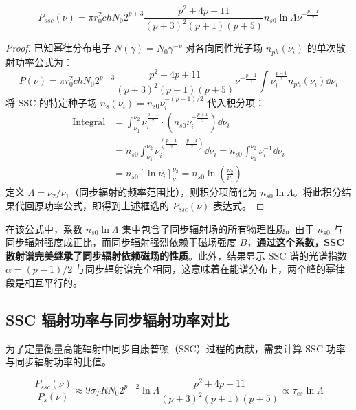 \begin{theorem}
    \begin{equation}
        \boxed{P_{ssc}(\nu) = \pi r_0^2 ch N_0 2^{p+3} \frac{p^2+4p+11}{(p+3)^2(p+1)(p+5)} n_{s0} \ln \Lambda \nu^{-\frac{p-1}{2}}}
    \end{equation}
\end{theorem}

\begin{proof}
    已知幂律分布电子 $N(\gamma) = N_0 \gamma^{-p}$ 对各向同性光子场 $n_{ph}(\nu_i)$ 的单次散射功率公式为：
    \begin{equation}
        P(\nu) = \pi r_0^2 ch N_0 2^{p+3} \frac{p^2+4p+11}{(p+3)^2(p+1)(p+5)} \nu^{-\frac{p-1}{2}} \int \nu_i^{\frac{p-1}{2}} n_{ph}(\nu_i) \dd{\nu_i}
    \end{equation}
    将 SSC 的特定种子场 $n_s(\nu_i) = n_{s0} \nu_i^{-(p+1)/2}$ 代入积分项：
    \begin{align}
        \text{Integral} &= \int_{\nu_1}^{\nu_2} \nu_i^{\frac{p-1}{2}} \cdot \left( n_{s0} \nu_i^{-\frac{p+1}{2}} \right) \dd{\nu_i} \nonumber \\
        &= n_{s0} \int_{\nu_1}^{\nu_2} \nu_i^{\left( \frac{p-1}{2} - \frac{p+1}{2} \right)} \dd{\nu_i} = n_{s0} \int_{\nu_1}^{\nu_2} \nu_i^{-1} \dd{\nu_i} \nonumber \\
        &=  n_{s0} [\ln \nu_i]_{\nu_1}^{\nu_2} = n_{s0} \ln \left( \frac{\nu_2}{\nu_1} \right)
    \end{align}
    定义 $\Lambda = \nu_2 / \nu_1$（同步辐射的频率范围比），则积分项简化为 $n_{s0} \ln \Lambda$。将此积分结果代回原功率公式，即得到上述框选的 $P_{ssc}(\nu)$ 表达式。
\end{proof}

在该公式中，系数 \textbf{$n_{s0} \ln \Lambda$} 集中包含了同步辐射场的所有物理性质。由于 $n_{s0}$ 与同步辐射强度成正比，而同步辐射强烈依赖于磁场强度 $B$，\textbf{通过这个系数，SSC 散射谱完美继承了同步辐射依赖磁场的性质}。此外，结果显示 SSC 谱的光谱指数 $\alpha = (p-1)/2$ 与同步辐射谱完全相同，这意味着在能谱分布上，两个峰的幂律段是相互平行的。

\subsection{SSC 辐射功率与同步辐射功率对比}

为了定量衡量高能辐射中同步自康普顿（SSC）过程的贡献，需要计算 SSC 功率与同步辐射功率的比值。

\begin{theorem}[功率之比]
    \begin{equation}
        \boxed{\frac{P_{ssc}(\nu)}{P_s(\nu)} \approx 9 \sigma_T R N_0 2^{p-2} \ln \Lambda \frac{p^2+4p+11}{(p+3)^2(p+1)(p+5)} \propto \tau_{es} \ln \Lambda}
    \end{equation}
\end{theorem}

